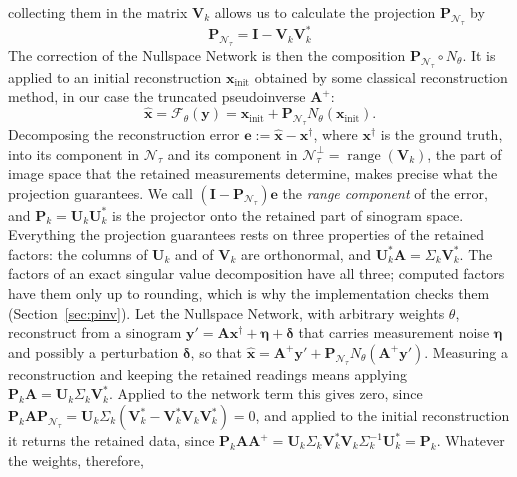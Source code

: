 \documentclass{article}
\numberwithin{equation}{section}
\begin{document}
collecting them in the matrix $\mathbf{V}_k$ allows us to calculate the projection $\mathbf{P}_{\mathcal{N}_\tau}$ by
\[\mathbf{P}_{\mathcal{N}_\tau} = \mathbf{I} - \mathbf{V}_k\mathbf{V}_k^*\]
The correction of the Nullspace Network is then the composition
$\mathbf{P}_{\mathcal{N}_\tau}\circ N_\theta$. It is applied to an initial reconstruction $\mathbf{x}_\text{init}$ obtained by some classical
reconstruction method, in our case the truncated pseudoinverse $\mathbf{A}^{+}$:
\[\hat{\mathbf{x}} = \mathcal{F}_\theta(\mathbf{y})=\mathbf{x}_\text{init} + \mathbf{P}_{\mathcal{N}_\tau}N_\theta(\mathbf{x}_\text{init}).\]
Decomposing the reconstruction error $\mathbf{e}:=\hat{\mathbf{x}}-\mathbf{x}^\dagger$, where
$\mathbf{x}^\dagger$ is the ground truth, into its component in $\mathcal{N}_\tau$ and its component in
$\mathcal{N}_\tau^\perp=\operatorname{range}(\mathbf{V}_k)$, the part of image space that the retained
measurements determine, makes precise what the projection guarantees. We call
$(\mathbf{I}-\mathbf{P}_{\mathcal{N}_\tau})\mathbf{e}$ the \emph{range component} of the error, and
$\mathbf{P}_k=\mathbf{U}_k\mathbf{U}_k^{*}$ is the projector onto the retained part of sinogram space.\\
Everything the projection guarantees rests on three properties of the retained factors: the columns of
$\mathbf{U}_k$ and of $\mathbf{V}_k$ are orthonormal, and $\mathbf{U}_k^{*}\mathbf{A}=\Sigma_k\mathbf{V}_k^{*}$.
The factors of an exact singular value decomposition have all three; computed factors have them only up to
rounding, which is why the implementation checks them (Section~\ref{sec:pinv}). Let the Nullspace Network,
with arbitrary weights $\theta$, reconstruct from a sinogram
$\mathbf{y}'=\mathbf{A}\mathbf{x}^\dagger+\boldsymbol{\eta}+\boldsymbol{\delta}$ that carries measurement
noise $\boldsymbol{\eta}$ and possibly a perturbation $\boldsymbol{\delta}$, so that
$\hat{\mathbf{x}}=\mathbf{A}^{+}\mathbf{y}'+\mathbf{P}_{\mathcal{N}_\tau}N_\theta(\mathbf{A}^{+}\mathbf{y}')$.
Measuring a reconstruction and keeping the retained readings means applying
$\mathbf{P}_k\mathbf{A}=\mathbf{U}_k\Sigma_k\mathbf{V}_k^{*}$. Applied to the network term this gives zero,
since $\mathbf{P}_k\mathbf{A}\mathbf{P}_{\mathcal{N}_\tau}=\mathbf{U}_k\Sigma_k(\mathbf{V}_k^{*}-\mathbf{V}_k^{*}\mathbf{V}_k\mathbf{V}_k^{*})=0$,
and applied to the initial reconstruction it returns the retained data, since
$\mathbf{P}_k\mathbf{A}\mathbf{A}^{+}=\mathbf{U}_k\Sigma_k\mathbf{V}_k^{*}\mathbf{V}_k\Sigma_k^{-1}\mathbf{U}_k^{*}=\mathbf{P}_k$.
Whatever the weights, therefore,
\end{document}
